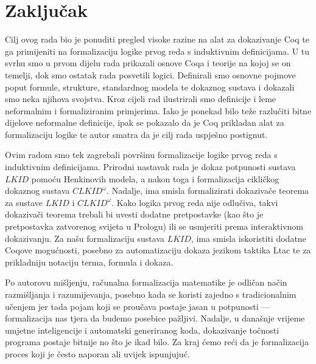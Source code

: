 \chapter*{Zaključak}\label{cha:zakljucak}
Cilj ovog rada bio je ponuditi pregled visoke razine na alat za dokazivanje Coq te
ga primijeniti na formalizaciju logike prvog reda s induktivnim definicijama.
U tu svrhu smo u prvom dijelu rada prikazali osnove Coqa i teorije na kojoj se on temelji,
dok smo ostatak rada posvetili logici.
Definirali smo osnovne pojmove poput formule, strukture, standardnog modela te dokaznog sustava
i dokazali smo neka njihova svojstva.
Kroz cijeli rad ilustrirali smo definicije i leme neformalnim i formaliziranim primjerima.
Iako je ponekad bilo teže razlučiti bitne dijelove neformalne definicije,
ipak se pokazalo da je Coq prikladan alat za formalizaciju logike te autor smatra
da je cilj rada uspješno postignut.

Ovim radom smo tek zagrebali površinu formalizacije logike prvog reda s induktivnim definicijama.
Prirodni nastavak rada je dokaz potpunosti sustava \(\mathit{LKID}\) pomoću Henkinovih modela,
a nakon toga i formalizacija cikličkog dokaznog sustava \(\mathit{CLKID}^{\omega}\)\!.
Nadalje, ima smisla formalizirati dokazivače teorema za sustave \(\mathit{LKID}\)
i \(\mathit{CLKID}^{\omega}\)\!. Kako logika prvog reda nije odlučiva, takvi dokazivači teorema
trebali bi uvesti dodatne pretpostavke (kao što je pretpostavka zatvorenog svijeta u Prologu)
ili se usmjeriti prema interaktivnom dokazivanju.
Za našu formalizaciju sustava \(\mathit{LKID}\),
ima smisla iskoristiti dodatne Coqove mogućnosti,
posebno za automatizaciju dokaza jezikom taktika Ltac
te za prikladniju notaciju terma, formula i dokaza.

Po autorovu mišljenju, računalna formalizacija matematike je odličan način razmišljanja i razumijevanja,
posebno kada se koristi zajedno s tradicionalnim učenjem jer tada 
 pojam koji se proučava postaje jasan u potpunosti --- formalizacija nas tjera da budemo
posebice pažljivi. Nadalje, u današnje vrijeme umjetne inteligencije i automatski
generiranog koda, dokazivanje točnosti programa postaje bitnije no što je ikad bilo.
Za kraj ćemo reći da je formalizacija proces koji je često naporan ali uvijek ispunjujuć.


